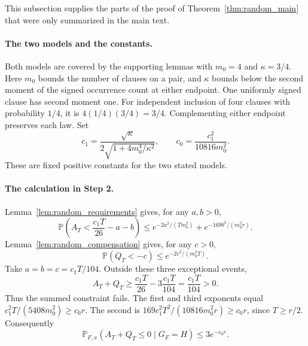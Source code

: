 \documentclass[11pt,a4paper]{article}
\theoremstyle{definition}
\theoremstyle{remark}
\newcommand{\Prb}{\mathbb P}
\begin{document}
This subsection supplies the parts of the proof of
Theorem~\ref{thm:random_main} that were only summarized in the main text.

\paragraph{The two models and the constants.}
Both models are covered by the supporting lemmas with $m_0=4$ and
$\kappa=3/4$. Here $m_0$ bounds the number of clauses on a pair, and
$\kappa$ bounds below the second moment of the signed occurrence count
at either endpoint. One uniformly signed clause has second moment one.
For independent inclusion of four clauses with probability $1/4$, it is
$4(1/4)(3/4)=3/4$. Complementing either endpoint preserves each law.
Set
\[
 c_1=\frac{\sqrt\kappa}{2\sqrt{1+4m_0^4/\kappa^2}},
 \qquad c_0=\frac{c_1^2}{10816m_0^2}.
\]
These are fixed positive constants for the two stated models.

\paragraph{The calculation in Step 2.}
Lemma~\ref{lem:random_requirements} gives, for any $a,b>0$,
\[
 \Prb\left(A_T<\frac{c_1T}{26}-a-b\right)
 \le e^{-2a^2/(Tm_0^2)}+e^{-169b^2/(m_0^2r)}.
\]
Lemma~\ref{lem:random_compensation} gives, for any $c>0$,
\[
 \Prb(Q_T<-c)\le e^{-2c^2/(m_0^2T)}.
\]
Take $a=b=c=c_1T/104$. Outside these three exceptional events,
\[
 A_T+Q_T\ge\frac{c_1T}{26}
              -3\frac{c_1T}{104}
          =\frac{c_1T}{104}>0.
\]
Thus the summed constraint fails. The first and third exponents equal
$c_1^2T/(5408m_0^2)\ge c_0r$.
The second is
$169c_1^2T^2/(10816m_0^2r)\ge c_0r$, since $T\ge r/2$.
Consequently
\[
 \Prb_{F,x}(A_T+Q_T\le0\mid G_F=H)\le3e^{-c_0r}.
\]
\end{document}
